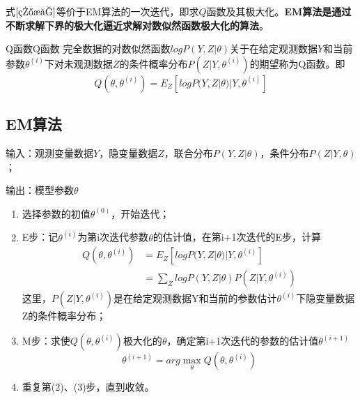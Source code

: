 式$\ref{目标}$等价于EM算法的一次迭代，即求$Q$函数及其极大化。\textbf{EM算法是通过不断求解下界的极大化逼近求解对数似然函数极大化的算法}。
\begin{definition}{Q函数}{Q函数}
	完全数据的对数似然函数$logP(Y,Z|\theta)$关于在给定观测数据$Y$和当前参数$\theta^{(i)}$下对未观测数据$Z$的条件概率分布$P(Z|Y,\theta^{(i)})$的期望称为Q函数。即
	\begin{equation}
		Q(\theta,\theta^{(i)})=E_Z[log P(Y,Z|\theta)|Y,\theta^{(i)}]
	\end{equation}
\end{definition}
\subsection*{EM算法}
输入：观测变量数据$Y$，隐变量数据$Z$，联合分布$P(Y,Z|\theta)$，条件分布$P(Z|Y,\theta)$；

输出：模型参数$\theta$

\begin{enumerate}
	\item 选择参数的初值$\theta^{(0)}$，开始迭代；
	
	\item E步：记$\theta^{(i)}$为第i次迭代参数$\theta$的估计值，在第i+1次迭代的E步，计算
	\begin{equation}
		\begin{aligned}
			Q(\theta,\theta^{(i)}) &= E_Z[log P(Y,Z|\theta) |Y,\theta^{(i)}] \\
			&= \sum_Zlog P(Y,Z|\theta)P(Z|Y,\theta^{(i)})
		\end{aligned}	
	\end{equation}
	这里，$P(Z|Y,\theta^{(i)})$是在给定观测数据Y和当前的参数估计$\theta^{(i)}$下隐变量数据Z的条件概率分布；
	
	\item M步：求使$Q(\theta,\theta^{(i)})$极大化的$\theta$，确定第i+1次迭代的参数的估计值$\theta^{(i+1)}$
	\begin{equation}
		\theta^{(i+1)} = arg \mathop{max}\limits_\theta Q(\theta, \theta^{(i)})
	\end{equation}
	
	\item 重复第(2)、(3)步，直到收敛。
\end{enumerate}
